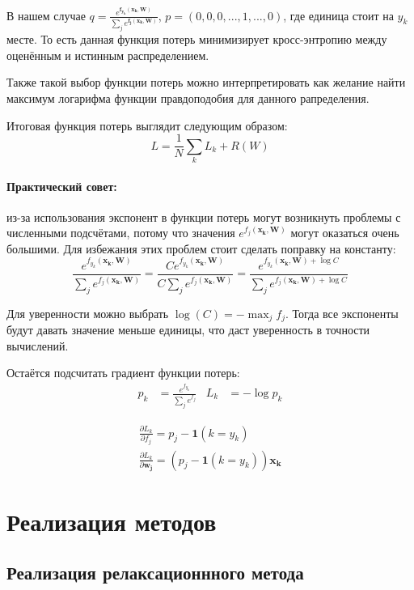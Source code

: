 \documentclass[a4paper]{article}
\newcommand{\xk}{\bm{x_k}}
\newcommand{\W}{\bm{W}}
\begin{document}
В нашем случае $q = \frac{e^{\bm{f_{y_k}(\xk, \W)}}}{\sum_je^{\bm{f_j(\xk, \W)}}}$, $p = (0,0,0,..., 1, ..., 0)$, где единица стоит на $y_k$ месте. То есть данная функция потерь минимизирует кросс-энтропию между оценённым и истинным распределением.

Также такой выбор функции потерь можно интерпретировать как желание найти максимум логарифма функции правдоподобия для данного рапределения.

Итоговая функция потерь выглядит следующим образом:
\begin{equation}
L = \frac{1}{N}\sum_k L_k + R(W)
\end{equation}

\paragraph*{Практический совет:} из-за использования экспонент в функции потерь могут возникнуть проблемы с численными подсчётами, потому что значения $e^{f_j(\xk, \W)}$ могут оказаться очень большими. Для избежания этих проблем стоит сделать поправку на константу:
\begin{equation}
\frac{e^{f_{y_k}(\xk, \W)}}{\sum_je^{f_j(\xk, \W)}} = \frac{Ce^{f_{y_k}(\xk, \W)}}{C\sum_je^{f_j(\xk, \W)}} = \frac{e^{f_{y_k}(\xk, \W) + \log C}}{\sum_je^{f_j(\xk, \W) + \log C}}
\end{equation}

Для уверенности можно выбрать $\log(C) = - \max_jf_j$. Тогда все экспоненты будут давать значение меньше единицы, что даст уверенность в точности вычислений.

Остаётся подсчитать градиент функции потерь:
\begin{align*}
p_k &= \frac{e^{f_{y_k}}}{\sum_je^{f_j}}     &       L_k &= -\log p_k
\end{align*}

\begin{eqnarray}
\frac{\partial L_k}{\partial f_j} = p_j - \bm{1}(k = y_k) \\
\frac{\partial L_k}{\partial \bm{w_j}} = \left(p_j - \bm{1}(k = y_k)\right) \xk
\end{eqnarray}

\section{Реализация методов}

\subsection{Реализация релаксационнного метода}
\end{document}
